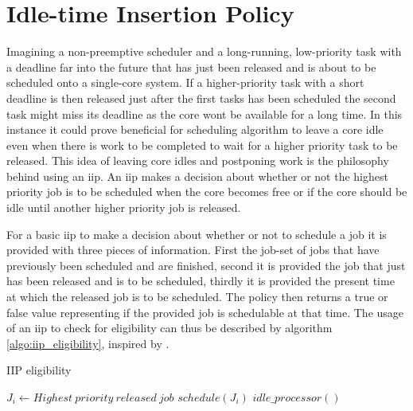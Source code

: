 \documentclass{kththesis}
\begin{document}
\section{Idle-time Insertion Policy} \label{sec:iip}


Imagining a non-preemptive scheduler and a long-running, low-priority task with a deadline far into
the future that has just been released and is about to be scheduled onto a single-core system. If a
higher-priority task with a short deadline is then released just after the first tasks has been
scheduled the second task might miss its deadline as the core wont be available for a long time. In
this instance it could prove beneficial for scheduling algorithm to leave a core idle even when
there is work to be completed to wait for a higher priority task to be released. This idea of
leaving core idles and postponing work is the philosophy behind using an \acrfull{iip}. An
\acrshort{iip} makes a decision about whether or not the highest priority job is to be scheduled
when the core becomes free or if the core should be idle until another higher priority job is
released.

For a basic \acrshort{iip} to make a decision about whether or not to schedule a job it is provided
with three pieces of information. First the job-set of jobs that have previously been scheduled and
are finished, second it is provided the job that just has been released and is to be scheduled,
thirdly it is provided the present time at which the released job is to be scheduled. The policy
then returns a true or false value representing if the provided job is schedulable at that time. The
usage of an \acrshort{iip} to check for eligibility can thus be described by algorithm
\ref{algo:iip_eligibility}, inspired by \parencite{nasri_exact_2017}.

\begin{algorithm}
    \caption{IIP eligibility}
    \label{algo:iip_eligibility}
    \begin{algorithmic}[1]
        \State $J_i\gets Highest\ priority\ released\ job$
            \State $schedule(J_i)$
        \Else
            \State $idle\_processor()$
        \EndIf
    \end{algorithmic}
\end{algorithm}
\end{document}
